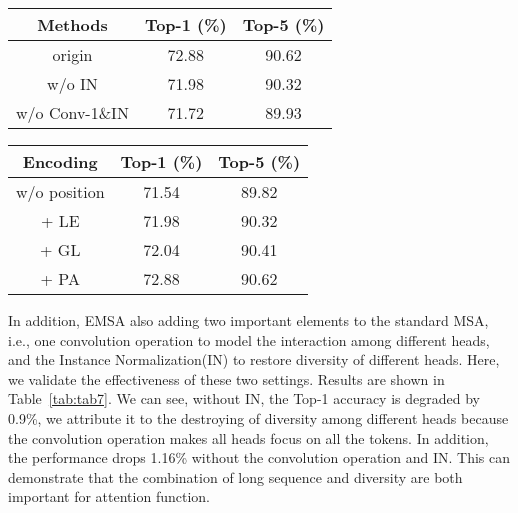 \documentclass{article}
\begin{document}
\begin{table*}[htb]
	\begin{minipage}{0.49\linewidth}  
	\centering
	\caption{Ablation study results on the important design elements of EMSA on ResT-Lite, including the  convolution operation and Instance Normalization in Eq.~\ref{eq:eqs}.}
	\label{tab:tab7}
\begin{tabular}{ccc}
		\toprule[1.2pt]
		Methods & Top-1 (\%) & Top-5 (\%) \\
		\midrule[1.1pt]
		origin & 72.88  & 90.62  \\  
		\midrule
		w/o IN & 71.98 & 90.32 \\
		\midrule
		w/o Conv-1\&IN  & 71.72 & 89.93 \\ 
		\bottomrule[1.2pt]
	\end{tabular}


\end{minipage}
	\hfill
	\begin{minipage}{0.49\linewidth}  
		\centering
		\caption{Comparison of various positional encoding (PE) strategies on ResT-Lite.}
		\label{tab:ta6}
		\centering
		\begin{tabular}{ccc}
			\toprule[1.2pt]
			Encoding & Top-1 (\%) & Top-5 (\%) \\ 
			\midrule[1.1pt]
			w/o position & 71.54 & 89.82 \\ 
			\midrule
			+ LE & 71.98 & 90.32 \\
			\midrule
			+ GL & 72.04 & 90.41 \\
			\midrule
			+ PA & 72.88  & 90.62  \\ 
			\bottomrule[1.2pt]
		\end{tabular}
		
	\end{minipage}
\end{table*}      

In addition, EMSA also adding two important elements to the standard MSA, i.e., one  convolution operation to model the interaction among different heads, and the Instance Normalization(IN) to restore diversity of different heads. Here, we validate the effectiveness of these two settings. Results are shown in Table~\ref{tab:tab7}. We can see, without IN, the Top-1 accuracy is degraded by 0.9\%, we attribute it to the destroying of diversity among different heads because the  convolution operation makes all heads focus on all the tokens. In addition, the performance drops 1.16\% without the convolution operation and IN. This can demonstrate that the combination of long sequence and diversity are both important for attention function. 
\end{document}
